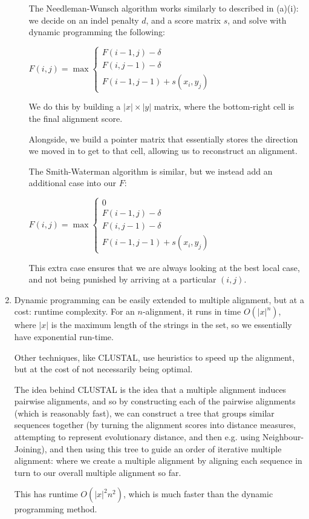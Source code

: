 \begin{enumerate}[label=(\alph*)]
\begin{enumerate}[label=(\roman*)]
        The Needleman-Wunsch algorithm works similarly to described in (a)(i): we decide on an indel penalty $d$, and a score matrix $s$, and solve with dynamic programming the following:

        $F(i,j) = \max \begin{cases}F(i-1, j) - \delta\\F(i, j-1) - \delta\\F(i-1, j-1) + s(x_i, y_j)\end{cases}$

        We do this by building a $|x| \times |y|$ matrix, where the bottom-right cell is the final alignment score.

        Alongside, we build a pointer matrix that essentially stores the direction we moved in to get to that cell, allowing us to reconstruct an alignment.

        The Smith-Waterman algorithm is similar, but we instead add an additional case into our $F$:

        $F(i,j) = \max \begin{cases}0\\F(i-1, j) - \delta\\F(i, j-1) - \delta\\F(i-1, j-1) + s(x_i, y_j)\end{cases}$

        This extra case ensures that we are always looking at the best local case, and not being punished by arriving at a particular $(i,j)$.
    \end{enumerate}

  \item
    Dynamic programming can be easily extended to multiple alignment, but at a cost: runtime complexity. For an $n$-alignment, it runs in time $O(|x|^n)$, where $|x|$ is the maximum length of the strings in the set, so we essentially have exponential run-time.

    Other techniques, like CLUSTAL, use heuristics to speed up the alignment, but at the cost of not necessarily being optimal.

    The idea behind CLUSTAL is the idea that a multiple alignment induces pairwise alignments, and so by constructing each of the pairwise alignments (which is reasonably fast), we can construct a tree that groups similar sequences together (by turning the alignment scores into distance measures, attempting to represent evolutionary distance, and then e.g. using Neighbour-Joining), and then using this tree to guide an order of iterative multiple alignment: where we create a multiple alignment by aligning each sequence in turn to our overall multiple alignment so far.

    This has runtime $O(|x|^2n^2)$, which is much faster than the dynamic programming method.

        
\end{enumerate}


